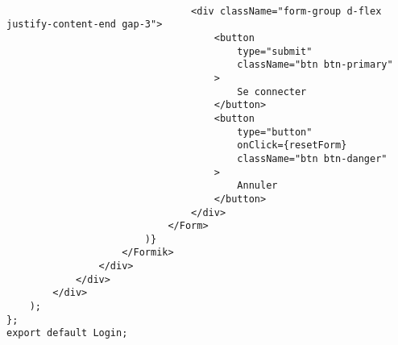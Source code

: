 \documentclass[10pt,a4paper]{article}
\begin{document}
\begin{verbatim}
                               
                                <div className="form-group d-flex justify-content-end gap-3">
                                    <button
                                        type="submit"
                                        className="btn btn-primary"
                                    >
                                        Se connecter
                                    </button>
                                    <button
                                        type="button"
                                        onClick={resetForm}
                                        className="btn btn-danger"
                                    >
                                        Annuler
                                    </button>
                                </div>
                            </Form>
                        )}
                    </Formik>
                </div>
            </div>
        </div>
    );
};   
export default Login;

\end{verbatim}
\end{document}
